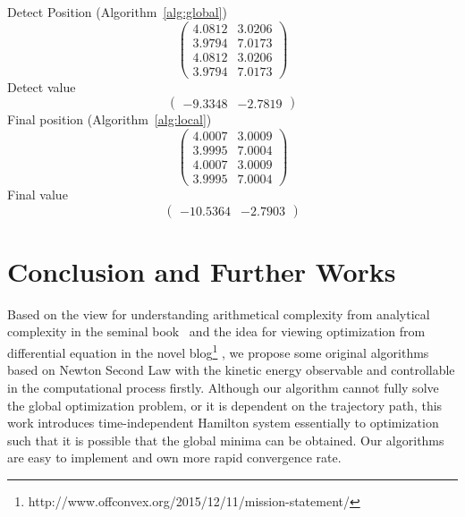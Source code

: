 \documentclass[11pt,fceqn]{article}
\numberwithin{equation}{section}
\theoremstyle{definition}
\begin{document}
\begin{enumerate}[label=\textbf{(\arabic*)}]
\begin{enumerate}[label=\textbf{(\alph*)}]
Detect Position (Algorithm~\ref{alg:global})
$$
\begin{pmatrix}
4.0812 & 3.0206  \\
3.9794 & 7.0173  \\
4.0812 & 3.0206  \\
3.9794 & 7.0173 
\end{pmatrix}
$$
Detect value
$$
\begin{pmatrix}
-9.3348 & -2.7819
\end{pmatrix}
$$
Final position (Algorithm~\ref{alg:local})
$$
\begin{pmatrix}
4.0007 & 3.0009  \\
3.9995 & 7.0004  \\
4.0007 & 3.0009 \\
3.9995 & 7.0004
\end{pmatrix}
$$
Final value
$$
\begin{pmatrix}
-10.5364 & -2.7903
\end{pmatrix}
$$
\end{enumerate}
\end{enumerate}



\section{Conclusion and Further Works}
\label{sec:conclusion}

Based on the view for understanding arithmetical complexity from analytical complexity in the seminal book~\citep{nesterov2013introductory} and the idea for viewing optimization from differential equation in the novel blog\footnote{http://www.offconvex.org/2015/12/11/mission-statement/} , we propose  some original algorithms based on Newton Second Law with the kinetic energy observable and controllable in the computational process firstly. Although our algorithm cannot fully solve the global optimization problem, or it is dependent on the trajectory path, this work introduces time-independent Hamilton system essentially to optimization such that it is possible that the global minima can be obtained. Our algorithms are easy to implement and own more rapid convergence rate.
\end{document}
